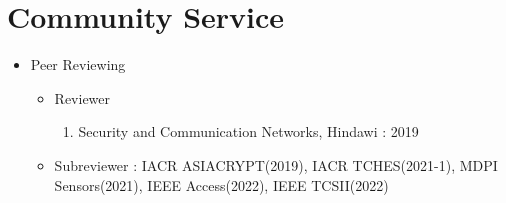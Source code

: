 \documentclass[a4paper,20pt]{article}
\begin{document}
\iffalse
\section{\textbf{Talk}}
    \item {Work in Progress}
        \vspace{-6pt}
        \begin{enumerate}
            \item {blah}
            \vspace{-2pt}
        \end{enumerate}
    \begin{itemize}
        \item {blah}
        \vspace{-4pt}
    \end{itemize}
\fi



\iffalse
\section{\textbf{Teaching}}
\item {Work in Progress}
        \vspace{-6pt}
        \begin{enumerate}
            \item {blah}
            \vspace{-2pt}
        \end{enumerate}
    \begin{itemize}
        \item {blah}
        \vspace{-4pt}
    \end{itemize}
\fi



\section{\textbf{Community Service}}
\begin{itemize}
    \item {Peer Reviewing}
        \vspace{-6pt}
        \begin{itemize}
            \item {Reviewer}
                \vspace{-4pt}
                \begin{enumerate}
                    \item {Security and Communication Networks, Hindawi : 2019}
                \end{enumerate}
            \item {Subreviewer : IACR ASIACRYPT(2019), IACR TCHES(2021-1), MDPI Sensors(2021), IEEE Access(2022), IEEE TCSII(2022)}
        \end{itemize}
\end{itemize}
\end{document}
